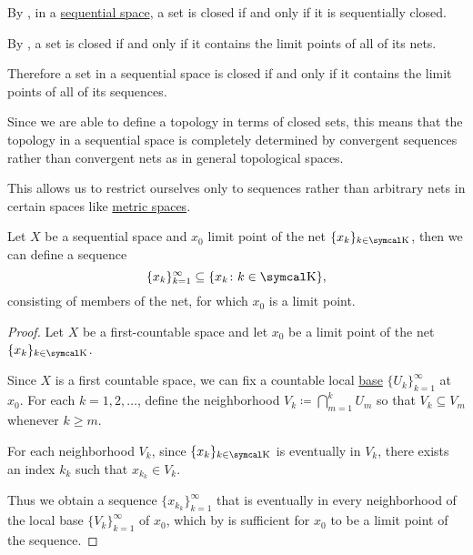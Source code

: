 \begin{remark}\label{remark:sequential_spaces}
  By , in a \hyperref[def:sequential_space]{sequential space}, a set is closed if and only if it is sequentially closed.

  By , a set is closed if and only if it contains the limit points of all of its nets.

  Therefore a set in a sequential space is closed if and only if it contains the limit points of all of its sequences.

  Since we are able to define a topology in terms of closed sets, this means that the topology in a sequential space is completely determined by convergent sequences rather than convergent nets as in general topological spaces.

  This allows us to restrict ourselves only to sequences rather than arbitrary nets in certain spaces like \hyperref[def:metric_space]{metric spaces}.
\end{remark}

\begin{lemma}\label{thm:sequential_space_convergence}
  Let \( X \) be a sequential space and \( x_0 \) limit point of the net \( \{ x_k \}_{k \in \CK} \), then we can define a sequence
  \begin{equation*}
    \{ x_k \}_{k=1}^\infty \subseteq \{ x_k \colon k \in \CK \},
  \end{equation*}
  consisting of members of the net, for which \( x_0 \) is a limit point.
\end{lemma}
\begin{proof}
  Let \( X \) be a first-countable space and let \( x_0 \) be a limit point of the net \( \{ x_k \}_{k \in \CK} \).

  Since \( X \) is a first countable space, we can fix a countable local \hyperref[def:topological_local_base]{base} \( \{ U_k \}_{k=1}^\infty \) at \( x_0 \). For each \( k = 1, 2, \ldots \), define the neighborhood \( V_k \coloneqq \bigcap_{m=1}^k U_m \) so that \( V_k \subseteq V_m \) whenever \( k \geq m \).

  For each neighborhood \( V_k \), since \( \{ x_k \}_{k \in \CK} \) is eventually in \( V_k \), there exists an index \( k_k \) such that \( x_{k_k} \in V_k \).

  Thus we obtain a sequence \( \{ x_{k_k} \}_{k=1}^\infty \) that is eventually in every neighborhood of the local base \( \{ V_k \}_{k=1}^\infty \) of \( x_0 \), which by  is sufficient for \( x_0 \) to be a limit point of the sequence.
\end{proof}

